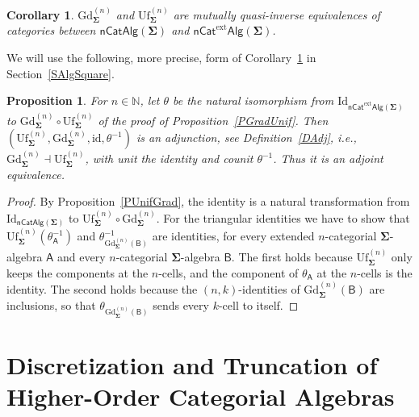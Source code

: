 \documentclass{amsart}
\theoremstyle{plain}
\newtheorem{proposition}[theorem]{Proposition}
\newtheorem{corollary}[theorem]{Corollary}
\theoremstyle{definition}
\begin{document}
\begin{corollary}\label{CGdUfEquiv}
$\mathrm{Gd}^{(n)}_{\mathbf{\Sigma}}$ and $\mathrm{Uf}^{(n)}_{\mathbf{\Sigma}}$ are mutually quasi-inverse equivalences of categories between $\mathsf{nCatAlg}(\mathbf{\Sigma})$ and $\mathsf{nCat}^{\mathrm{ext}}\mathsf{Alg}(\mathbf{\Sigma})$.
\end{corollary}

We will use the following, more precise, form of Corollary~\ref{CGdUfEquiv} in Section~\ref{SAlgSquare}.

\begin{proposition}\label{PGdUfAdj}
For $n\in\mathbb{N}$, let $\theta$ be the natural isomorphism from $\mathrm{Id}_{\mathsf{nCat}^{\mathrm{ext}}\mathsf{Alg}(\mathbf{\Sigma})}$ to $\mathrm{Gd}^{(n)}_{\mathbf{\Sigma}}\circ\mathrm{Uf}^{(n)}_{\mathbf{\Sigma}}$ of the proof of Proposition~\ref{PGradUnif}. Then $(\mathrm{Uf}^{(n)}_{\mathbf{\Sigma}},\mathrm{Gd}^{(n)}_{\mathbf{\Sigma}},\mathrm{id},\theta^{-1})$ is an adjunction, see Definition~\ref{DAdj}, i.e., $\mathrm{Gd}^{(n)}_{\mathbf{\Sigma}}\dashv\mathrm{Uf}^{(n)}_{\mathbf{\Sigma}}$, with unit the identity and counit $\theta^{-1}$. Thus it is an adjoint equivalence.
\end{proposition}
\begin{proof}
By Proposition~\ref{PUnifGrad}, the identity is a natural transformation from $\mathrm{Id}_{\mathsf{nCatAlg}(\mathbf{\Sigma})}$ to $\mathrm{Uf}^{(n)}_{\mathbf{\Sigma}}\circ\mathrm{Gd}^{(n)}_{\mathbf{\Sigma}}$. For the triangular identities we have to show that $\mathrm{Uf}^{(n)}_{\mathbf{\Sigma}}(\theta^{-1}_{\boldsymbol{\mathsf{A}}})$ and $\theta^{-1}_{\mathrm{Gd}^{(n)}_{\mathbf{\Sigma}}(\boldsymbol{\mathsf{B}})}$ are identities, for every extended $n$-categorial $\mathbf{\Sigma}$-algebra $\boldsymbol{\mathsf{A}}$ and every $n$-categorial $\mathbf{\Sigma}$-algebra $\boldsymbol{\mathsf{B}}$. The first holds because $\mathrm{Uf}^{(n)}_{\mathbf{\Sigma}}$ only keeps the components at the $n$-cells, and the component of $\theta_{\boldsymbol{\mathsf{A}}}$ at the $n$-cells is the identity. The second holds because the $(n,k)$-identities of $\mathrm{Gd}^{(n)}_{\mathbf{\Sigma}}(\boldsymbol{\mathsf{B}})$ are inclusions, so that $\theta_{\mathrm{Gd}^{(n)}_{\mathbf{\Sigma}}(\boldsymbol{\mathsf{B}})}$ sends every $k$-cell to itself.
\end{proof}

\section{Discretization and Truncation of Higher-Order Categorial Algebras}\label{STruncation}
\end{document}
